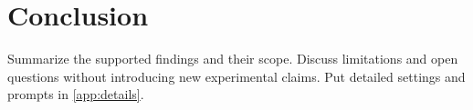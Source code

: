 \section{Conclusion}
\label{sec:conclusion}
Summarize the supported findings and their scope. Discuss limitations and
open questions without introducing new experimental claims. Put detailed
settings and prompts in \cref{app:details}.
